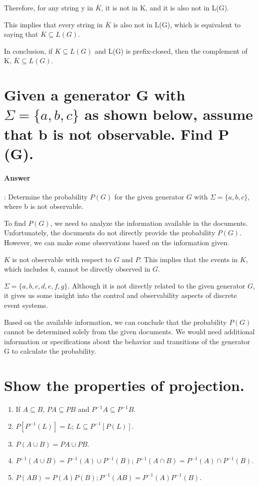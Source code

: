 \documentclass{article}
\begin{document}
Therefore, for any string y in $\overline{K}$, it is not in K, and it is also not in L(G).

This implies that every string in $\overline{K}$ is also not in L(G), which is equivalent to saying that $\overline{K} \subseteq L(G)$.

In conclusion, if $K \subseteq L(G)$ and L(G) is prefix-closed, then the complement of K, $\overline{K} \subseteq L(G)$.

\section{Given a generator G with $\Sigma = \{a, b, c\}$ as shown below, assume that b is not observable. Find P (G).}

\paragraph{Answer}:
Determine the probability $P(G)$ for the given generator $G$ with $\Sigma = \{a, b, c\}$, where b is not observable.

To find $P(G)$, we need to analyze the information available in the documents. Unfortunately, the documents do not directly provide the probability $P(G)$. However, we can make some observations based on the information given.

$K$ is not observable with respect to $G$ and $P$. This implies that the events in $K$, which includes $b$, cannot be directly observed in $G$.

$\Sigma = \{a, b, c, d, e, f, g\}$. Although it is not directly related to the given generator $G$, it gives us some insight into the control and observability aspects of discrete event systems.

Based on the available information, we can conclude that the probability $P(G)$ cannot be determined solely from the given documents. We would need additional information or specifications about the behavior and transitions of the generator G to calculate the probability.


\section{Show the properties of projection.}

\begin{enumerate}
  \item If $A \subseteq B$, $P A \subseteq P B$ and $P^{-1}A \subseteq P^{-1}B$.
  \item $P [P^{-1}(L)] = L$; $L \subseteq P^{-1}[P (L)]$.
  \item $P (A \cup B) = P A \cup P B$.
  \item $P^{-1} (A \cup B) = P^{-1} (A) \cup P^{-1} (B)$; $P^{-1} (A \cap B) = P^{-1} (A) \cap P^{-1} (B)$.
  \item $P (AB) = P (A)P (B); P^{-1} (AB) = P^{-1} (A)P^{-1}(B)$.
\end{enumerate}
\end{document}
